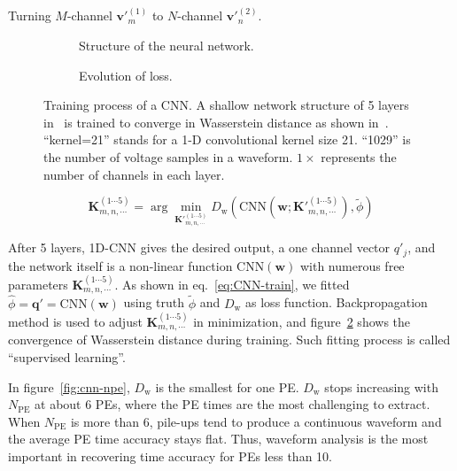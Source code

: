 Turning $M$-channel $\bm{v'}^{(1)}_m$ to $N$-channel $\bm{v'}^{(2)}_n$.

\begin{figure}[H]
  \begin{subfigure}{.4\textwidth}
    \centering
    \begin{adjustbox}{width=0.5\textwidth}
      
    \end{adjustbox}
    \caption{\label{fig:struct} Structure of the neural network.}
  \end{subfigure}
  \begin{subfigure}{.5\textwidth}
    \centering
    \resizebox{\textwidth}{!}{}
    \caption{\label{fig:loss} Evolution of loss.}
  \end{subfigure}
  \caption{\label{fig:CNN} Training process of a CNN. A shallow network structure of 5 layers in~ is trained to converge in Wasserstein distance as shown in~.  ``kernel=21'' stands for a 1-D convolutional kernel size 21. ``1029'' is the number of voltage samples in a waveform.  $1\times$ represents the number of channels in each layer.}
\end{figure}
\vspace{-0.8cm}

\begin{equation}
  \bm{K}^{(1\cdots 5)}_{m,n,\cdots} = \arg\underset{\bm{K'}^{(1\cdots 5)}_{m,n,\cdots}}{\min} D_\mathrm{w}(\mathrm{CNN}(\bm{w}; \bm{K'}^{(1\cdots 5)}_{m,n,\cdots}), \tilde{\phi})
  \label{eq:CNN-train}
\end{equation}

After 5 layers, 1D-CNN gives the desired output, a one channel vector $q'_j$, and the network itself is a non-linear function $\mathrm{CNN}(\bm{w})$ with numerous free parameters $\bm{K}^{(1\cdots5)}_{m,n,\cdots}$. As shown in eq.~\eqref{eq:CNN-train}, we fitted $\hat{\phi}=\bm{q}'=\mathrm{CNN}(\bm{w})$ using truth $\tilde{\phi}$ and $D_\mathrm{w}$ as loss function. Backpropagation method is used to adjust $\bm{K}^{(1\cdots5)}_{m,n,\cdots}$ in minimization, and figure~\ref{fig:loss} shows the convergence of Wasserstein distance during training. Such fitting process is called ``supervised learning''.

In figure~\ref{fig:cnn-npe}, $D_\mathrm{w}$ is the smallest for one PE.  $D_\mathrm{w}$ stops increasing with $N_\mathrm{PE}$ at about 6 PEs, where the PE times are the most challenging to extract.  When $N_\mathrm{PE}$ is more than 6, pile-ups tend to produce a continuous waveform and the average PE time accuracy stays flat. Thus, waveform analysis is the most important in recovering time accuracy for PEs less than 10.

